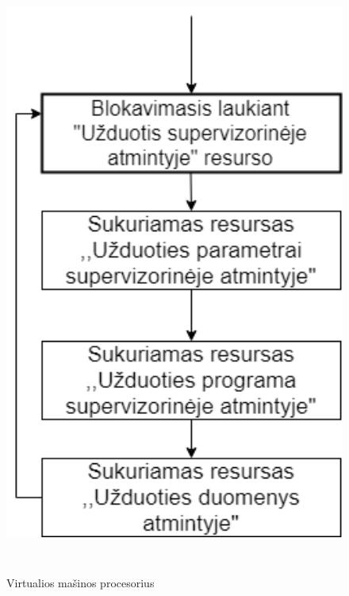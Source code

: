 \documentclass[oneside]{VUMIFPSkursinis}
\begin{document}
\begin{figure}[H]
		\centering	
	\includegraphics[width=18cm,height=20cm,keepaspectratio]{JLC.png}
	\caption{Virtualios mašinos procesorius}
	\label{fig:Virtualios mašinos procesorius}
\end{figure} 
\end{document}
